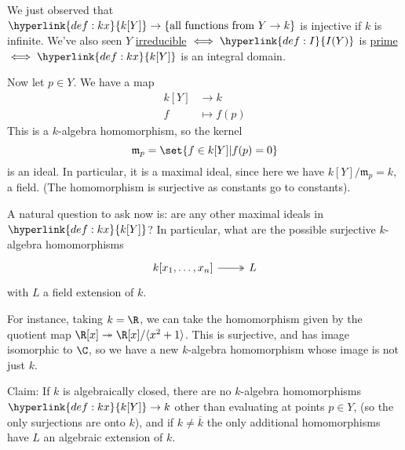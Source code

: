 \documentclass{article}
\begin{document}
We just observed that $\hyperlink{def:kx}{k[Y]} \to \{\text{all functions from } Y \to k\}$ is injective if $k$ is infinite.
We've also seen $Y$ \hyperlink{def:reducible}{irreducible} $\iff \hyperlink{def:I}{I(Y)}$ is \hyperlink{def:prime}{prime} $\iff \hyperlink{def:kx}{k[Y]}$ is an integral domain.

Now let $p \in Y$. We have a map
\begin{align*}
    k[Y] &\longrightarrow k \\
    f &\longmapsto f(p)
\end{align*}
This is a $k$-algebra homomorphism, so the kernel
\begin{equation*}
    \mathfrak{m}_p = \set{f \in k[Y] | f(p) = 0}
\end{equation*}
is an ideal.
In particular, it is a maximal ideal, since here we have $k[Y]/\mathfrak{m}_p = k$, a field.
(The homomorphism is surjective as constants go to constants).

A natural question to ask now is: are any other maximal ideals in $\hyperlink{def:kx}{k[Y]}$?
In particular, what are the possible surjective $k$-algebra homomorphisms
\begin{equation*}
    \begin{tikzcd}
        k[x_1, \dotsc, x_n] \ar[r, two heads] & L
    \end{tikzcd}
\end{equation*}
with $L$ a field extension of $k$.

For instance, taking $k=\R$, we can take the homomorphism given by the quotient map $\R[x] \twoheadrightarrow \R[x]/\langle x^2 + 1 \rangle$.
This is surjective, and has image isomorphic to $\C$, so we have a new $k$-algebra homomorphism whose image is not just $k$.

Claim:
If $k$ is algebraically closed, there are no $k$-algebra homomorphisms $\hyperlink{def:kx}{k[Y]} \to k$ other than evaluating at points $p \in Y$, (so the only surjections are onto $k$), and if $k \neq \overline{k}$ the only additional homomorphisms have $L$ an algebraic extension of $k$.
\end{document}
